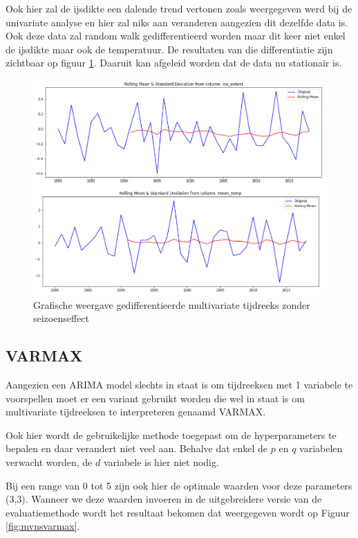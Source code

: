 Ook hier zal de ijsdikte een dalende trend vertonen zoals weergegeven werd bij de univariate analyse en hier zal niks aan veranderen aangezien dit dezelfde data is. Ook deze data zal random walk gedifferentieerd worden maar dit keer niet enkel de ijsdikte maar ook de temperatuur. De resultaten van die differentiatie zijn zichtbaar op figuur \ref{fig:mvnsdatadiff}. Daaruit kan afgeleid worden dat de data nu stationair is.

\begin{figure}
    \centering
    \caption{Grafische weergave gedifferentieerde multivariate tijdreeks zonder seizoenseffect}
    \label{fig:mvnsdatadiff}
    \includegraphics[width=1\linewidth]{mv_ns_data_diff}
\end{figure}

\subsection{VARMAX}
Aangezien een ARIMA model slechts in staat is om tijdreeksen met 1 variabele te voorspellen moet er een variant gebruikt worden die wel in staat is om multivariate tijdreeksen te interpreteren genaamd VARMAX. 

Ook hier wordt de gebruikelijke methode toegepast om de hyperparameters te bepalen en daar verandert niet veel aan. Behalve dat enkel de $p$ en $q$ variabelen verwacht worden, de $d$ variabele is hier niet nodig. 

Bij een range van 0 tot 5 zijn ook hier de optimale waarden voor deze parameters (3,3). Wanneer we deze waarden invoeren in de uitgebreidere versie van de evaluatiemethode wordt het resultaat bekomen dat weergegeven wordt op Figuur \ref{fig:mvnsvarmax}.


